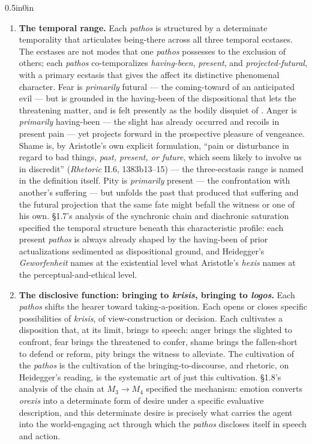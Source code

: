 \begin{adjustwidth}{0.5in}{0in}
\begin{enumerate}
\item \textbf{The temporal range.} Each \textit{pathos} is structured by a determinate temporality that articulates being-there across all three temporal ecstases. The ecstases are not modes that one \textit{pathos} possesses to the exclusion of others; each \textit{pathos} co-temporalizes \textit{having-been}, \textit{present}, and \textit{projected-futural}, with a primary ecstasis that gives the affect its distinctive phenomenal character. Fear is \textit{primarily} futural --- the coming-toward of an anticipated evil --- but is grounded in the having-been of the dispositional  that lets the threatening matter, and is felt presently as the bodily disquiet of . Anger is \textit{primarily} having-been --- the slight has already occurred and recoils in present pain --- yet projects forward in the prospective pleasure of vengeance. Shame is, by Aristotle's own explicit formulation, ``pain or disturbance in regard to bad things, \textit{past, present, or future}, which seem likely to involve us in discredit'' (\textit{Rhetoric} II.6, 1383b13--15) --- the three-ecstasis range is named in the definition itself. Pity is \textit{primarily} present --- the confrontation with another's suffering --- but unfolds the past that produced that suffering and the futural projection that the same fate might befall the witness or one of his own. \S1.7's analysis of the synchronic chain and diachronic saturation specified the temporal structure beneath this characteristic profile: each present \textit{pathos} is always already shaped by the having-been of prior actualizations sedimented as dispositional ground, and Heidegger's \textit{Geworfenheit} names at the existential level what Aristotle's \textit{hexis} names at the perceptual-and-ethical level.

\item \textbf{The disclosive function: bringing to \textit{krisis}, bringing to \textit{logos}.} Each \textit{pathos} shifts the hearer toward taking-a-position. Each opens or closes specific possibilities of \textit{krisis}, of view-construction or decision. Each cultivates a disposition that, at its limit, brings to speech: anger brings the slighted to confront, fear brings the threatened to confer, shame brings the fallen-short to defend or reform, pity brings the witness to alleviate. The cultivation of the \textit{pathos} is the cultivation of the bringing-to-discourse, and rhetoric, on Heidegger's reading, is the systematic art of just this cultivation. \S1.8's analysis of the chain at $M_3 \rightarrow M_4$ specified the mechanism: emotion converts \textit{orexis} into a determinate form of desire under a specific evaluative description, and this determinate desire is precisely what carries the agent into the world-engaging act through which the \textit{pathos} discloses itself in speech and action.
\end{enumerate}
\end{adjustwidth}

